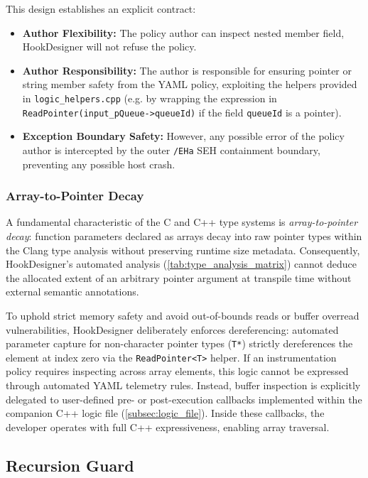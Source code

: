 This design establishes an explicit contract:
\begin{itemize}
	\item \textbf{Author Flexibility:} The policy author can inspect  nested member field, HookDesigner will not refuse the policy.
	\item \textbf{Author Responsibility:} The author is responsible for ensuring pointer or string member safety from the YAML policy, exploiting the helpers provided in \texttt{logic\_helpers.cpp} (e.g. by wrapping the expression in \texttt{ReadPointer(}\allowbreak\texttt{input\_pQueue->queueId)} if the field \texttt{queueId} is a pointer).
	\item \textbf{Exception Boundary Safety:} However, any possible error of the policy author is intercepted by the outer \texttt{/EHa} SEH containment boundary, preventing any possible host crash.
\end{itemize}

\subsubsection{Array-to-Pointer Decay}
\label{subsubsec:array_decay}

A fundamental characteristic of the C and C++ type systems is \emph{array-to-pointer decay}: function parameters declared as arrays decay into raw pointer types within the Clang type analysis without preserving runtime size metadata.
Consequently, HookDesigner's automated analysis (\cref{tab:type_analysis_matrix}) cannot deduce the allocated extent of an arbitrary pointer argument at transpile time without external semantic annotations.

To uphold strict memory safety and avoid out-of-bounds reads or buffer overread vulnerabilities, HookDesigner deliberately enforces dereferencing: automated parameter capture for non-character pointer types (\texttt{T*}) strictly dereferences the element at index zero via the \texttt{ReadPointer<T>} helper.
If an instrumentation policy requires inspecting across array elements, this logic cannot be expressed through automated YAML telemetry rules.
Instead, buffer inspection is explicitly delegated to user-defined pre- or post-execution callbacks implemented within the companion C++ logic file (\cref{subsec:logic_file}).
Inside these callbacks, the developer operates with full C++ expressiveness, enabling array traversal.

\subsection{Recursion Guard}
\label{subsec:recursion_guard}

